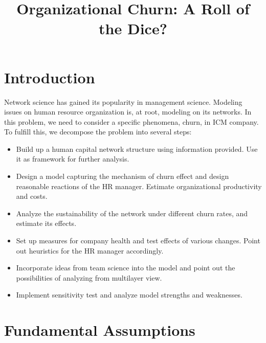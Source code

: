 \documentclass[tcn = 37075, sheet = false, abstract = false]{mcmthesis}
\title{Organizational Churn: A Roll of the Dice?}
\author{}
\date{}
\begin{document}
	\maketitle
	
	
	\setcounter{tocdepth}{2}
	\tableofcontents
	
	\section{Introduction}
	
	Network science has gained its popularity in management science. Modeling issues on human resource organization is, at root, modeling on its networks. In this problem, we need to consider a specific phenomena, churn, in  ICM company. To fulfill this, we decompose the problem into several steps:
	
	\begin{itemize}
		\item Build up a human capital network structure using information provided. Use it as framework for further analysis.
		\item Design a model capturing the mechanism of churn effect and design reasonable reactions of the HR manager. Estimate organizational productivity and costs.
		\item Analyze the sustainability of the network under different churn rates, and estimate its effects.
		\item Set up measures for company health and test effects of various changes. Point out heuristics for the HR manager accordingly.
		\item Incorporate ideas from team science into the model and point out the possibilities of analyzing from multilayer view.
		\item Implement sensitivity test and analyze model strengths and weaknesses.
	\end{itemize}
	
	\section{Fundamental Assumptions}
	
\end{document}

